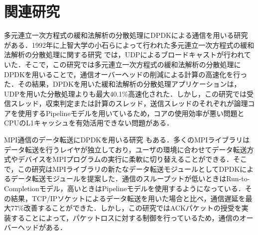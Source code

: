 \section{関連研究}
\label{sec:RelatedWorks}
多元連立一次方程式の緩和法解析の分散処理にDPDKによる通信を用いる研究 \cite{RelaxationMethodDPDK} がある．1992年に上智大学の小石らによって行われた多元連立一次方程式の緩和法解析の分散処理に関する研究 \cite{RelaxationMethodUDP} では，UDPによるブロードキャストが行われていた．そこで，この研究では多元連立一次方程式の緩和法解析の分散処理にDPDKを用いることで，通信オーバーヘッドの削減による計算の高速化を行った．その結果，DPDKを用いた緩和法解析の分散処理アプリケーションは，UDPを用いた分散処理よりも最大40.1\%高速化された．しかし，この研究では受信スレッド，収束判定または計算のスレッド，送信スレッドのそれぞれが論理コアを使用するPipelineモデルを用いているため，コアの使用効率が悪い問題とCPUのL1キャッシュを有効活用できない問題がある．

MPI通信のデータ転送にDPDKを用いる研究 \cite{MPIDPDK} もある．多くのMPIライブラリはデータ転送を行うレイヤが独立しており，ユーザの環境に合わせてデータ転送方式やデバイスをMPIプログラムの実行に柔軟に切り替えることができる．そこで，この研究はMPIライブラリの新たなデータ転送モジュールとしてDPDKによるデータ転送モジュールを提案した．通信のスループットが低いときはRun-to-Completionモデル，高いときはPipelineモデルを使用するようになっている．その結果，TCP/IPソケットによるデータ転送を用いた場合と比べ，通信遅延を最大77\%改善することができた．しかし，この研究ではACKパケットの授受を実装することによって，パケットロスに対する制御を行っているため，通信のオーバーヘッドがある．
